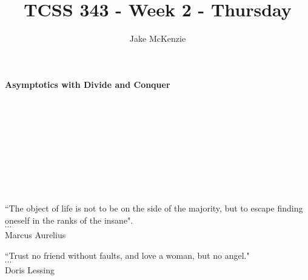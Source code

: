 \documentclass[12pt]{article}
\begin{document}
\title{TCSS 343 - Week 2 - Thursday}
\author{Jake McKenzie}
\maketitle
\noindent\centerline{\textbf{Asymptotics with Divide and Conquer}}\\\\\\\\\\\\\\\\
\begin{center}
    ``The object of life is not to be on the side of the majority, but to escape finding oneself in the ranks of the insane". \\$\cdots$\\ Marcus Aurelius
\end{center}
\begin{center}
    ``Trust no friend without faults, and love a woman, but no angel."\\
    $\cdots$\\
    Doris Lessing
\end{center}
\newpage
\end{document}
